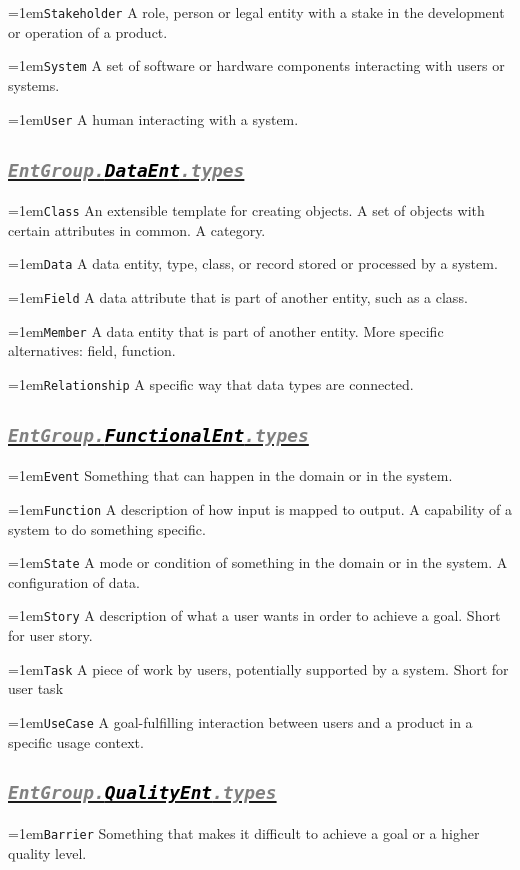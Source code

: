 \documentclass[a4paper,oneside]{article}
\newcommand\Concept[2]{\hangindent=1em\lstinline+#1+ #2}
\begin{document}
\begin{multicols*}{4}
\Concept{Stakeholder}{A role, person or legal entity with a stake in the development or operation of a product.}

\Concept{System}{A set of software or hardware components interacting with users or systems.}

\Concept{User}{A human interacting with a system.}


\subsection*{\underline{\texttt{\textit{{\textcolor{gray}{EntGroup.}\textcolor{black}{DataEnt}}\textcolor{gray}{.types}}}}}
\Concept{Class}{An extensible template for creating objects. A set of objects with certain attributes in common. A category.}

\Concept{Data}{A data entity, type, class, or record stored or processed by a system.}

\Concept{Field}{A data attribute that is part of another entity, such as a class.}

\Concept{Member}{A data entity that is part of another entity. More specific alternatives: field, function.}

\Concept{Relationship}{A specific way that data types are connected.}


\subsection*{\underline{\texttt{\textit{{\textcolor{gray}{EntGroup.}\textcolor{black}{FunctionalEnt}}\textcolor{gray}{.types}}}}}
\Concept{Event}{Something that can happen in the domain or in the system.}

\Concept{Function}{A description of how input is mapped to output. A capability of a system to do something specific.}

\Concept{State}{A mode or condition of something in the domain or in the system. A configuration of data.}

\Concept{Story}{A description of what a user wants in order to achieve a goal. Short for user story.}

\Concept{Task}{A piece of work by users, potentially supported by a system. Short for user task}

\Concept{UseCase}{A goal-fulfilling interaction between users and a product in a specific usage context.}


\subsection*{\underline{\texttt{\textit{{\textcolor{gray}{EntGroup.}\textcolor{black}{QualityEnt}}\textcolor{gray}{.types}}}}}
\Concept{Barrier}{Something that makes it difficult to achieve a goal or a higher quality level.}


\end{multicols*}
\end{document}
